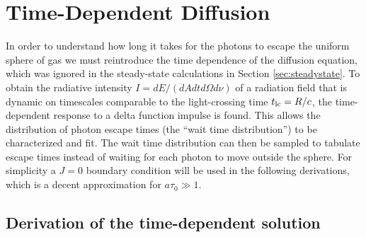 \documentclass{aastex63}
\begin{document}
\section{Time-Dependent Diffusion}
\label{sec:time_dependent}

In order to understand how long it takes for the photons to escape the uniform sphere of gas we must reintroduce the time dependence of the diffusion equation, which was ignored in the steady-state calculations in Section \ref{sec:steadystate}. To obtain the radiative intensity $I=dE/(dAdtd\Omega d\nu)$ of a radiation field that is dynamic on timescales comparable to the light-crossing time $t_{\rm lc} = R/c$, the time-dependent response to a delta function impulse is found. This allows the distribution of photon escape times (the ``wait time distribution'') to be characterized and fit. The wait time distribution can then be sampled to tabulate escape times instead of waiting for each photon to move outside the sphere. For simplicity a $J=0$ boundary condition will be used in the following derivations, which is a decent approximation for $a\tau_0 \gg 1$. 

\subsection{Derivation of the time-dependent solution}
\label{subsec:time_dependent:background}
\end{document}
